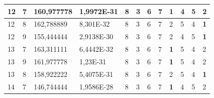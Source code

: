 \documentclass[conference]{IEEEtran}
\begin{document}
\begin{table}[]
\begin{tabular}{|llll|llllllll|}
		\multicolumn{1}{|l|}{12}  & \multicolumn{1}{l|}{7}         & \multicolumn{1}{l|}{160,977778}    & 1,9972E-31 & \multicolumn{1}{l|}{8}   & \multicolumn{1}{l|}{3}   & \multicolumn{1}{l|}{6}   & \multicolumn{1}{l|}{7}   & \multicolumn{1}{l|}{\textbf{1}} & \multicolumn{1}{l|}{4}   & \multicolumn{1}{l|}{5}   & 2                      \\ \hline
		\multicolumn{1}{|l|}{12}  & \multicolumn{1}{l|}{8}         & \multicolumn{1}{l|}{162,788889}    & 8,301E-32  & \multicolumn{1}{l|}{8}   & \multicolumn{1}{l|}{3}   & \multicolumn{1}{l|}{6}   & \multicolumn{1}{l|}{7}   & \multicolumn{1}{l|}{2}          & \multicolumn{1}{l|}{5}   & \multicolumn{1}{l|}{4}   & \textbf{1}             \\ \hline
		\multicolumn{1}{|l|}{12}  & \multicolumn{1}{l|}{9}         & \multicolumn{1}{l|}{155,444444}    & 2,9138E-30 & \multicolumn{1}{l|}{8}   & \multicolumn{1}{l|}{3}   & \multicolumn{1}{l|}{6}   & \multicolumn{1}{l|}{7}   & \multicolumn{1}{l|}{2}          & \multicolumn{1}{l|}{4}   & \multicolumn{1}{l|}{5}   & \textbf{1}             \\ \hline
		\multicolumn{1}{|l|}{13}  & \multicolumn{1}{l|}{7}         & \multicolumn{1}{l|}{163,311111}    & 6,4442E-32 & \multicolumn{1}{l|}{8}   & \multicolumn{1}{l|}{3}   & \multicolumn{1}{l|}{6}   & \multicolumn{1}{l|}{7}   & \multicolumn{1}{l|}{\textbf{1}} & \multicolumn{1}{l|}{5}   & \multicolumn{1}{l|}{4}   & 2                      \\ \hline
		\multicolumn{1}{|l|}{13}  & \multicolumn{1}{l|}{9}         & \multicolumn{1}{l|}{161,977778}    & 1,23E-31   & \multicolumn{1}{l|}{8}   & \multicolumn{1}{l|}{3}   & \multicolumn{1}{l|}{6}   & \multicolumn{1}{l|}{7}   & \multicolumn{1}{l|}{\textbf{1}} & \multicolumn{1}{l|}{5}   & \multicolumn{1}{l|}{4}   & 2                      \\ \hline
		\multicolumn{1}{|l|}{13}  & \multicolumn{1}{l|}{8}         & \multicolumn{1}{l|}{158,922222}    & 5,4075E-31 & \multicolumn{1}{l|}{8}   & \multicolumn{1}{l|}{3}   & \multicolumn{1}{l|}{6}   & \multicolumn{1}{l|}{7}   & \multicolumn{1}{l|}{2}          & \multicolumn{1}{l|}{5}   & \multicolumn{1}{l|}{4}   & \textbf{1}             \\ \hline
		\multicolumn{1}{|l|}{14}  & \multicolumn{1}{l|}{7}         & \multicolumn{1}{l|}{146,744444}    & 1,9586E-28 & \multicolumn{1}{l|}{8}   & \multicolumn{1}{l|}{3}   & \multicolumn{1}{l|}{6}   & \multicolumn{1}{l|}{7}   & \multicolumn{1}{l|}{\textbf{1}} & \multicolumn{1}{l|}{4}   & \multicolumn{1}{l|}{5}   & 2                      \\ \hline

\end{tabular}
\end{table}
\end{document}
